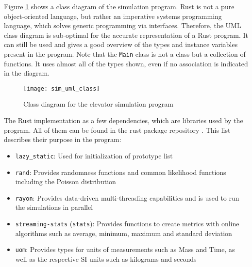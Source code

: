 Figure \ref{fig:impl:simclass} shows a class diagram of the simulation program.
Rust is not a pure object-oriented language, but rather an imperative systems programming language, which solves generic programming via interfaces.
Therefore, the \ac{UML} class diagram is sub-optimal for the accurate representation of a Rust program.
It can still be used and gives a good overview of the types and instance variables present in the program.
Note that the \texttt{Main} class is not a class but a collection of functions.
It uses almost all of the types shown, even if no association is indicated in the diagram.

\begin{figure}[p]
    \centering
    \texttt{[image: sim\_uml\_class]}
    \caption{Class diagram for the elevator simulation program}
    \label{fig:impl:simclass}
\end{figure}

The Rust implementation as a few dependencies, which are libraries used by the program.
All of them can be found in the rust package repository \autocite[][]{rust2018cratesio}.
This list describes their purpose in the program:
\begin{samepage}
\begin{itemize}[noitemsep]
    \item \texttt{lazy\_static}: Used for initialization of prototype list
    \item \texttt{rand}: Provides randomness functions and common likelihood functions including the Poisson distribution
    \item \texttt{rayon}: Provides data-driven multi-threading capabilities and is used to run the simulations in parallel
    \item \texttt{streaming-stats} (\texttt{stats}): Provides functions to create metrics with online algorithms such as average,  minimum, maximum and standard deviation
    \item \texttt{uom}: Provides types for units of measurements such as Mass and Time, as well as the respective \ac{SI} units such as kilograms and seconds
\end{itemize}
\end{samepage}





